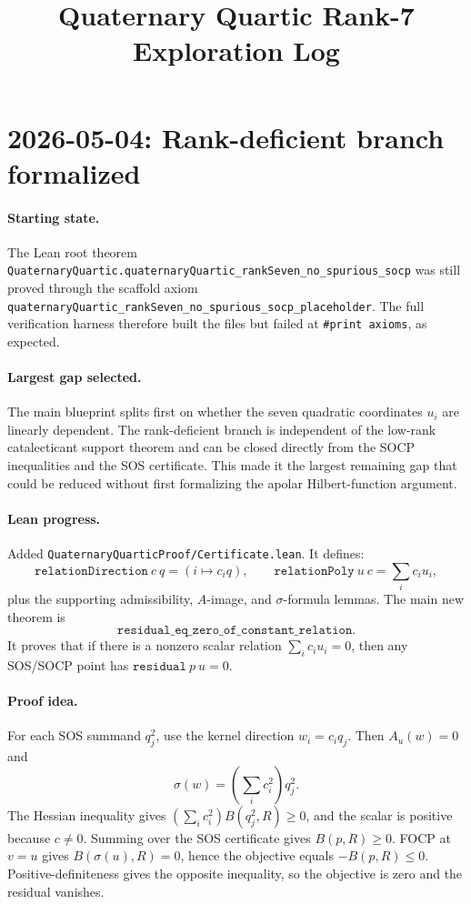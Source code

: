 \documentclass[11pt]{article}
\title{Quaternary Quartic Rank-7 Exploration Log}
\author{}
\date{}
\begin{document}
\maketitle

\section*{2026-05-04: Rank-deficient branch formalized}

\paragraph{Starting state.}
The Lean root theorem
\texttt{QuaternaryQuartic.quaternaryQuartic\_rankSeven\_no\_spurious\_socp}
was still proved through the scaffold axiom
\texttt{quaternaryQuartic\_rankSeven\_no\_spurious\_socp\_placeholder}.
The full verification harness therefore built the files but failed at
\texttt{\#print axioms}, as expected.

\paragraph{Largest gap selected.}
The main blueprint splits first on whether the seven quadratic coordinates
\(u_i\) are linearly dependent.  The rank-deficient branch is independent of
the low-rank catalecticant support theorem and can be closed directly from the
SOCP inequalities and the SOS certificate.  This made it the largest remaining
gap that could be reduced without first formalizing the apolar Hilbert-function
argument.

\paragraph{Lean progress.}
Added \texttt{QuaternaryQuarticProof/Certificate.lean}.  It defines:
\[
\texttt{relationDirection}\ c\ q=(i\mapsto c_i q),\qquad
\texttt{relationPoly}\ u\ c=\sum_i c_i u_i,
\]
plus the supporting admissibility, \(A\)-image, and \(\sigma\)-formula lemmas.
The main new theorem is
\[
\texttt{residual\_eq\_zero\_of\_constant\_relation}.
\]
It proves that if there is a nonzero scalar relation
\(\sum_i c_i u_i=0\), then any SOS/SOCP point has
\(\texttt{residual}\ p\ u=0\).

\paragraph{Proof idea.}
For each SOS summand \(q_j^2\), use the kernel direction
\(w_i=c_i q_j\).  Then \(A_u(w)=0\) and
\[
\sigma(w)=\left(\sum_i c_i^2\right)q_j^2.
\]
The Hessian inequality gives
\(\left(\sum_i c_i^2\right)B(q_j^2,R)\ge0\), and the scalar is positive
because \(c\ne0\).  Summing over the SOS certificate gives \(B(p,R)\ge0\).
FOCP at \(v=u\) gives \(B(\sigma(u),R)=0\), hence the objective equals
\(-B(p,R)\le0\).  Positive-definiteness gives the opposite inequality, so the
objective is zero and the residual vanishes.
\end{document}
